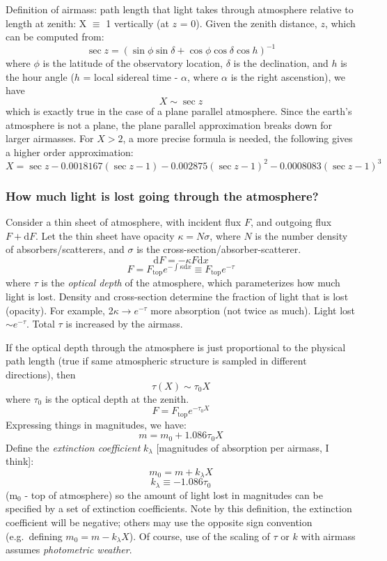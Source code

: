 \documentclass[12pt]{article}
\begin{document}
Definition of airmass: path length that light takes through atmosphere
relative to length at zenith: X $\equiv$ 1 vertically (at $z$ = 0).
Given the zenith distance, $z$, which can be computed from:
    $$ \sec z = \left(\sin\phi\sin\delta +
                 \cos\phi\cos\delta\cos h\right)^{-1} $$
where $\phi$ is the latitude of the observatory location,
$\delta$ is the declination, and $h$ is
the hour angle ($h$ = local sidereal time - $\alpha$, where $\alpha$ is
the right ascenstion), we have
    $$ X \sim \sec z $$
which is exactly true in the case of a plane parallel atmosphere. Since
the earth's atmosphere is not a plane, the plane parallel
approximation breaks down for larger airmasses. For $X>2$, a more
precise formula is needed, the following gives a higher order
approximation:
    $$ X = \sec z - 0.0018167(\sec z-1)
                  - 0.002875(\sec z-1)^2
                  - 0.0008083(\sec z-1)^3 $$

\subsubsection*{How much light is lost going through the atmosphere?}
Consider a thin sheet of atmosphere, with incident flux $F$, and
outgoing flux $F + \textrm{d}F$.
Let the thin sheet have opacity $\kappa = N\sigma$,
where $N$ is the number density of absorbers/scatterers, and
$\sigma$ is the cross-section/absorber-scatterer.
    $$ \textrm{d}F = -\kappa F \textrm{d}x $$
    $$ F = F_{\textrm{top}}e^{-\int\kappa\textrm{d}x}
         \equiv F_{\textrm{top}}e^{-\tau} $$
where $\tau$ is the \emph{optical depth} of the atmosphere, which
parameterizes how much light is lost.
\textcolor{myBlue}{Density and cross-section determine the fraction
    of light that is lost (opacity). For example, 2$\kappa \rightarrow
    e^{-\tau}$ more absorption (not twice as much).
    Light lost $\sim e^{-\tau}$.
    Total $\tau$ is increased by the airmass.
}

If the optical depth through the atmosphere is just proportional to
the physical path length (true if same atmospheric structure is
sampled in different directions), then
    $$ \tau(X) \sim \tau_0X $$
where $\tau_0$ is the optical depth at the zenith.
    $$ F = F_{\textrm{top}}e^{-\tau_0X} $$
Expressing things in magnitudes, we have:
    $$ m = m_0 + 1.086\tau_0X $$
Define the \emph{extinction coefficient} $k_{\lambda}$ [magnitudes of
absorption per airmass, I think]:
    $$ m_0 = m + k_{\lambda}X $$
    $$ k_{\lambda} \equiv -1.086\tau_0 $$
(m$_0$ - top of atmosphere)
so the amount of light lost in magnitudes can be specified by a set of
extinction coefficients. Note by this definition, the extinction
coefficient will be negative; others may use the opposite sign
convention (e.g.\ defining $m_0 = m - k_{\lambda}X$). Of
course, use of the scaling of $\tau$ or $k$ with airmass assumes
\emph{photometric weather}.
\end{document}
